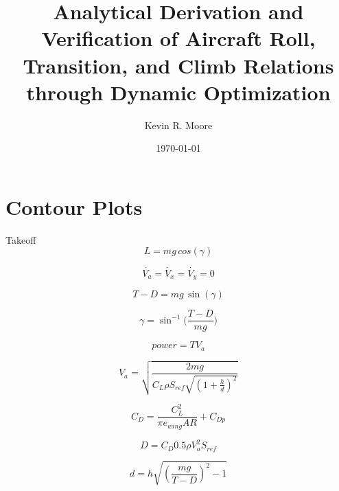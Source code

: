 \documentclass[10pt,english]{article}
\title{\vspace{-20pt}Analytical Derivation and Verification of Aircraft Roll, Transition, and Climb Relations through Dynamic Optimization }
\author{Kevin R. Moore}
\affil{\vspace{-10pt}Brigham Young University}
\date{\today}
\begin{document}
\maketitle

\section{Contour Plots}
%



\noindent Takeoff
    \begin{equation}
      L = m g \, cos(\gamma)
    \end{equation}

    \begin{equation}    
     \dot{V_a} =\dot{V_x} = \dot{V_y} = 0
    \end{equation}
    
        \begin{equation}    
     T-D = m g \, \sin(\gamma)
    \end{equation}
    
           \begin{equation}    
     \gamma = \sin^{-1}\Bigg(\frac{T-D}{mg}\Bigg)
    \end{equation}
    
               \begin{equation}    
     power = T V_a
    \end{equation}
    
    \begin{equation}    
    V_a = \sqrt{\frac{2 m g}{C_L \rho S_{ref} \sqrt{(1+\frac{h}{d})^2}}}
    \end{equation}
    
               \begin{equation}    
C_D = \frac{C_L^2}{\pi e_{wing} AR} + C_{Dp}
    \end{equation}
    
               \begin{equation}    
         D = C_D 0.5 \rho V_a^2 S_{ref}
    \end{equation}
    
        \begin{equation}    
d = h \sqrt{(\frac{m g}{T-D})^2-1}
    \end{equation}
    
\end{document}
